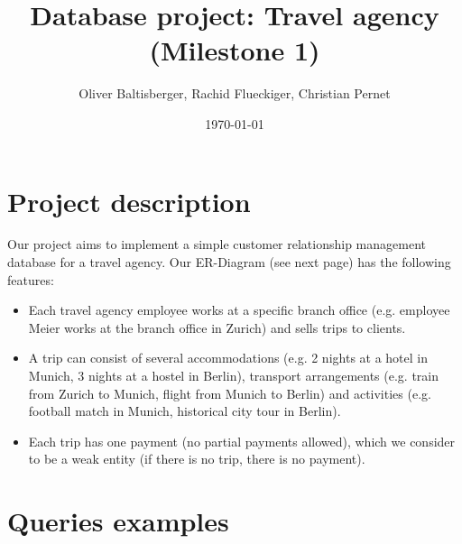 \documentclass{article}
\title{Database project: Travel agency \\ (Milestone 1)}
\author{Oliver Baltisberger, Rachid Flueckiger, Christian Pernet}
\date{\today}
\begin{document}
	\maketitle
	
	\section*{Project description}
	Our project aims to implement a simple customer relationship management database
	for a travel agency. Our ER-Diagram (see next page) has the following features:
	\begin{itemize}
		\item Each travel agency employee works at a specific branch office (e.g. employee Meier works at the branch office in Zurich) and sells trips to clients.
 		\item A trip can consist of several accommodations (e.g. 2 nights at a hotel in Munich, 3 nights at a hostel in Berlin), transport arrangements (e.g. train from Zurich to Munich, flight from Munich to Berlin) and activities (e.g. football match in Munich, historical city tour in Berlin).
		\item Each trip has one payment (no partial payments allowed), which we consider to be a weak entity (if there is no trip, there is no payment).
	\end{itemize}
	
	\section*{Queries examples}
			
\end{document}
